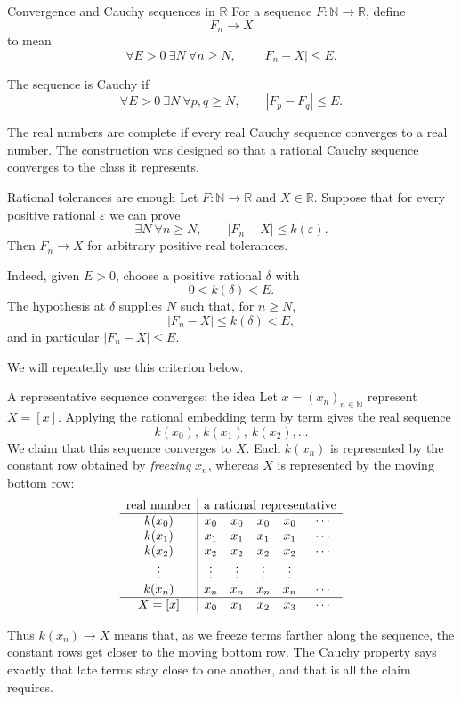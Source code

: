 \documentclass[aspectratio=169,11pt]{beamer}
\newcommand{\N}{\mathbb N}
\newcommand{\R}{\mathbb R}
\begin{document}
\begin{frame}{Convergence and Cauchy sequences in \(\R\)}
  For a sequence \(F\colon\N\to\R\), define
  \[
    F_n\longrightarrow X
  \]
  to mean
  \[
    \forall E>0\ \exists N\ \forall n\ge N,
    \qquad |F_n-X|\le E.
  \]

  The sequence is \alert{Cauchy} if
  \[
    \forall E>0\ \exists N\ \forall p,q\ge N,
    \qquad |F_p-F_q|\le E.
  \]

  The real numbers are \alert{complete} if every real Cauchy sequence
  converges to a real number.  The construction was designed so that a
  rational Cauchy sequence converges to the class it represents.
\end{frame}

\begin{frame}{Rational tolerances are enough}
  Let \(F\colon\N\to\R\) and \(X\in\R\).  Suppose that for every positive
  rational \(\varepsilon\) we can prove
  \[
    \exists N\ \forall n\ge N,
    \qquad |F_n-X|\le k(\varepsilon).
  \]
  Then \(F_n\to X\) for arbitrary positive real tolerances.

  Indeed, given \(E>0\), choose a positive rational \(\delta\) with
  \[
    0<k(\delta)<E.
  \]
  The hypothesis at \(\delta\) supplies \(N\) such that, for \(n\ge N\),
  \[
    |F_n-X|\le k(\delta)<E,
  \]
  and in particular \(|F_n-X|\le E\).

  We will repeatedly use this criterion below.
\end{frame}

\begin{frame}{A representative sequence converges: the idea}
  \small
  Let \(x=(x_n)_{n\in\N}\) represent \(X=[x]\).  Applying the rational
  embedding term by term gives the real sequence
  \[
    k(x_0),\ k(x_1),\ k(x_2),\ldots
  \]
  We claim that this sequence converges to \(X\).  Each \(k(x_n)\) is
  represented by the constant row obtained by \emph{freezing} \(x_n\),
  whereas \(X\) is represented by the moving bottom row:
  \[
    \begin{array}{c|ccccc}
      \text{real number}
        & \multicolumn{5}{c}{\text{a rational representative}}\\
      \hline
      k(x_0) & x_0 & x_0 & x_0 & x_0 & \cdots\\
      k(x_1) & x_1 & x_1 & x_1 & x_1 & \cdots\\
      k(x_2) & x_2 & x_2 & x_2 & x_2 & \cdots\\
      \vdots & \vdots&\vdots&\vdots&\vdots&\\
      k(x_n) & x_n & x_n & x_n & x_n & \cdots\\
      \hline
      X=[x]             & x_0 & x_1 & x_2 & x_3 & \cdots
    \end{array}
  \]

  Thus \(k(x_n)\to X\) means that, as we freeze terms farther along the
  sequence, the constant rows get closer to the moving bottom row.  The
  Cauchy property says exactly that late terms stay close to one another,
  and that is all the claim requires.
\end{frame}
\end{document}
